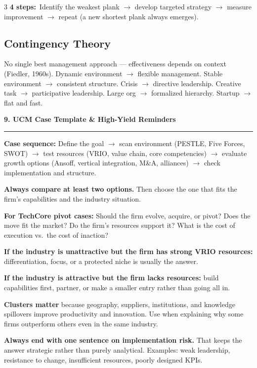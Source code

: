 \documentclass[7.6pt,letterpaper]{article}
\newcommand{\secbar}[1]{%
    \vspace{2pt}\noindent\textbf{#1}\par\vspace{1pt}\hrule\vspace{2pt}%
  }
\newcommand{\secbar}[1]{%
    \vspace{3pt}%
    \noindent\colorbox{navy}{\parbox{\dimexpr\linewidth-2\fboxsep}{%
      \fontsize{6.8pt}{8pt}\sffamily\bfseries\color{white}\strut\ #1\strut}}%
    \vspace{1pt}\par%
  }
\newcommand{\T}[1]{\textbf{\color{navy}#1}}
\newcommand{\kk}[2]{\noindent\T{#1}\ #2\par}
\begin{document}
\begin{multicols}{3}
\kk{4 steps:}{Identify the weakest plank $\to$ develop targeted strategy $\to$ measure improvement $\to$ repeat (a new shortest plank always emerges).}

\subsection{Contingency Theory}

No single best management approach --- effectiveness depends on context (Fiedler, 1960s). Dynamic environment $\to$ flexible management. Stable environment $\to$ consistent structure. Crisis $\to$ directive leadership. Creative task $\to$ participative leadership. Large org $\to$ formalized hierarchy. Startup $\to$ flat and fast.

\secbar{9. UCM Case Template \& High-Yield Reminders}

\T{Case sequence:} Define the goal $\to$ scan environment (PESTLE, Five Forces, SWOT) $\to$ test resources (VRIO, value chain, core competencies) $\to$ evaluate growth options (Ansoff, vertical integration, M\&A, alliances) $\to$ check implementation and structure.

\T{Always compare at least two options.} Then choose the one that fits the firm's capabilities and the industry situation.

\T{For TechCore pivot cases:} Should the firm evolve, acquire, or pivot? Does the move fit the market? Do the firm's resources support it? What is the cost of execution vs.\ the cost of inaction?

\T{If the industry is unattractive but the firm has strong VRIO resources:} differentiation, focus, or a protected niche is usually the answer.

\T{If the industry is attractive but the firm lacks resources:} build capabilities first, partner, or make a smaller entry rather than going all in.

\T{Clusters matter} because geography, suppliers, institutions, and knowledge spillovers improve productivity and innovation. Use when explaining why some firms outperform others even in the same industry.

\T{Always end with one sentence on implementation risk.} That keeps the answer strategic rather than purely analytical. Examples: weak leadership, resistance to change, insufficient resources, poorly designed KPIs.


\end{multicols}
\end{document}

